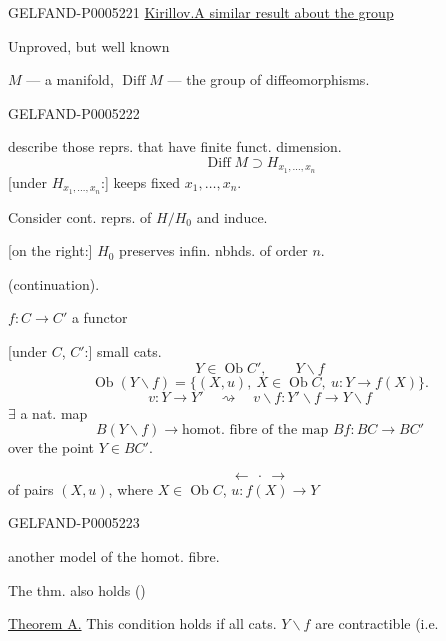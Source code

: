 \begin{GelfandAdjacentEvidence}{GELFAND-P000522}{1}
\uline{Kirillov.}\qquad \uline{A similar result about the group}

Unproved, but well known

$M$ — a manifold, $\operatorname{Diff}M$ — the group of diffeomorphisms.
\end{GelfandAdjacentEvidence}
\begin{GelfandAdjacentEvidence}{GELFAND-P000522}{2}


describe those reprs. that have finite funct. dimension.
\[
\operatorname{Diff}M\supset H_{x_1,\ldots,x_n}
\]
[under $H_{x_1,\ldots,x_n}$:] keeps fixed $x_1,\ldots,x_n$.

Consider cont. reprs. of $H/H_0$ and induce.

[on the right:] $H_0$ preserves infin. nbhds. of order $n$.

 (continuation).

$f:C\longrightarrow C'$ a functor

[under $C$, $C'$:] small cats.
\[
Y\in\operatorname{Ob}C',\qquad Y\backslash f
\]
\[
\operatorname{Ob}(Y\backslash f)=
\{(X,u),\ X\in\operatorname{Ob}C,\ u:Y\longrightarrow f(X)\}.
\]
\[
v:Y\longrightarrow Y'\quad\rightsquigarrow\quad
v\backslash f:Y'\backslash f\longrightarrow Y\backslash f
\]
$\exists$ a nat. map
\[
B(Y\backslash f)\longrightarrow
\text{homot. fibre of the map }Bf:BC\longrightarrow BC'
\]
over the point $Y\in BC'$.

\[
\longleftarrow\ \cdot\ \longrightarrow
\]
 of pairs $(X,u)$, where $X\in\operatorname{Ob}C$,
$u:f(X)\longrightarrow Y$
\end{GelfandAdjacentEvidence}
\begin{GelfandAdjacentEvidence}{GELFAND-P000522}{3}

another model of the homot. fibre.

The thm. also holds ()

\uline{Theorem A.} This condition holds if all cats. $Y\backslash f$ are contractible
(i.e.
\end{GelfandAdjacentEvidence}
